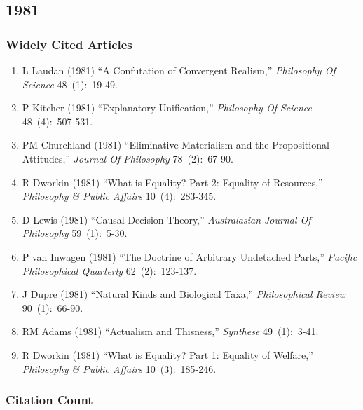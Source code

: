 \documentclass[
  10pt,
  letterpaper,
  DIV=11,
  numbers=noendperiod,
  twoside]{scrartcl}
\providecommand{\tightlist}{%
  \setlength{\itemsep}{0pt}\setlength{\parskip}{0pt}}\usepackage{longtable,booktabs,array}
\begin{document}
\newpage

\subsection{1981}\label{sec-s1981}

\subsubsection*{Widely Cited Articles}\label{widely-cited-articles-25}

\begin{enumerate}
\def\labelenumi{\arabic{enumi}.}
\tightlist
\item
  L Laudan (1981) ``A Confutation of Convergent Realism,''
  \emph{Philosophy Of Science} 48~(1):~19-49.
\item
  P Kitcher (1981) ``Explanatory Unification,'' \emph{Philosophy Of
  Science} 48~(4):~507-531.
\item
  PM Churchland (1981) ``Eliminative Materialism and the Propositional
  Attitudes,'' \emph{Journal Of Philosophy} 78~(2):~67-90.
\item
  R Dworkin (1981) ``What is Equality? Part 2: Equality of Resources,''
  \emph{Philosophy \& Public Affairs} 10~(4):~283-345.
\item
  D Lewis (1981) ``Causal Decision Theory,'' \emph{Australasian Journal
  Of Philosophy} 59~(1):~5-30.
\item
  P van Inwagen (1981) ``The Doctrine of Arbitrary Undetached Parts,''
  \emph{Pacific Philosophical Quarterly} 62~(2):~123-137.
\item
  J Dupre (1981) ``Natural Kinds and Biological Taxa,''
  \emph{Philosophical Review} 90~(1):~66-90.
\item
  RM Adams (1981) ``Actualism and Thisness,'' \emph{Synthese}
  49~(1):~3-41.
\item
  R Dworkin (1981) ``What is Equality? Part 1: Equality of Welfare,''
  \emph{Philosophy \& Public Affairs} 10~(3):~185-246.
\end{enumerate}

\subsubsection*{Citation Count}\label{sec-count-1981}
\end{document}
